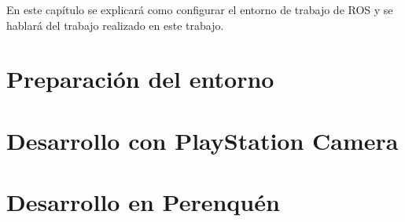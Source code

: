 
En este capítulo se explicará como configurar el entorno de trabajo de ROS y se
hablará del trabajo realizado en este trabajo.

\section{Preparación del entorno}
\label{4:sec1}


\section{Desarrollo con PlayStation Camera}
\label{4:sec2}




\section{Desarrollo en Perenquén}
\label{4:sec3}


